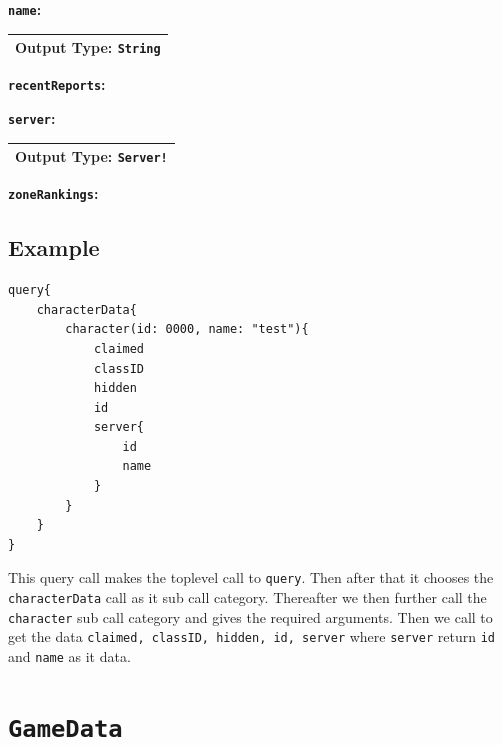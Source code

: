 \documentclass[10pt, a4paper]{memoir}
\numberwithin{equation}{section}
\theoremstyle{plain}
\theoremstyle{defp}
\theoremstyle{dotless}
\theoremstyle{definition}
\theoremstyle{dotless}
\theoremstyle{dotless}
\theoremstyle{defp}
\theoremstyle{defp}
\theoremstyle{be}          %
\theoremstyle{defp}
\newcommand\ttt[1]{\texttt{#1}}
\begin{document}
\medskip

\textbf{\ttt{name}:}

\begin{table}[h!]
	\centering
	\begin{tabular}{ |p{3cm}|p{3cm}|p{3cm}|  }
		\hline
		\multicolumn{3}{|c|}{Output Type: \ttt{String}} \\
		\hline
	\end{tabular}
\end{table}

\medskip

\textbf{\ttt{recentReports}:}

\medskip

\textbf{\ttt{server}:}

\begin{table}[h!]
	\centering
	\begin{tabular}{ |p{3cm}|p{3cm}|p{3cm}|  }
		\hline
		\multicolumn{3}{|c|}{Output Type: \ttt{Server!}} \\
		\hline
	\end{tabular}
\end{table}

\medskip

\textbf{\ttt{zoneRankings}:}



\subsection{Example}

\begin{lstlisting}[language=WowAPI]
query{
	characterData{
		character(id: 0000, name: "test"){
			claimed
			classID
			hidden
			id
			server{
				id
				name
			}
		}
	}
}
\end{lstlisting}

This query call makes the toplevel call to \ttt{query}. Then after that it chooses the \ttt{characterData} call as it sub call category. Thereafter we then further call  the \ttt{character} sub call category and gives the required arguments. Then we call to get the data \ttt{claimed, classID, hidden, id, server} where \ttt{server} return \ttt{id} and \ttt{name} as it data.  

\newpage

\section{\ttt{GameData}}\label{sec:GameData}
\end{document}
